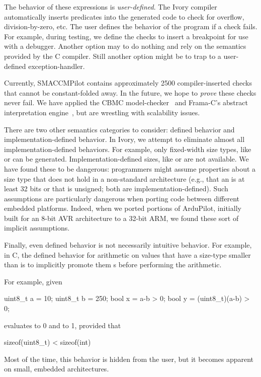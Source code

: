 The behavior of these expressions is \emph{user-defined}.  The Ivory compiler
automatically inserts predicates into the generated code to check for overflow,
division-by-zero, etc.  The user defines the behavior of the program if a check
fails.  For example, during testing, we define the checks to insert a
breakpoint for use with a debugger.  Another option may to do nothing and rely
on the semantics provided by the C compiler.  Still another option might be to
trap to a user-defined exception-handler.

Currently, SMACCMPilot contains approximately 2500 compiler-inserted checks that
cannot be constant-folded away.  In the future, we hope to \emph{prove} these
checks never fail.  We have applied the CBMC model-checker~\cite{} and Frama-C's
abstract interpretation engine~\cite{}, but are wrestling with scalability
issues.

There are two other semantics categories to consider: defined behavior and
implementation-defined behavior.  In Ivory, we attempt to eliminate almost all
implementation-defined behaviors.  For example, only fixed-width size types,
like  or  can be generated.  Implementation-defined
sizes, like  or  are not available.  We have found these to be
dangerous: programmers might assume properties about a size type that does not
hold in a non-standard architecture (e.g., that an  is at least 32 bits
or that  is unsigned; both are implementation-defined).  Such
assumptions are particularly dangerous when porting code between different
embedded platforms.  Indeed, when we ported portions of ArduPilot, initially built
for an 8-bit AVR architecture to a 32-bit ARM, we found these sort of implicit
assumptions.

Finally, even defined behavior is not necessarily intuitive behavior.  For
example, in C, the defined behavior for arithmetic on values that have a
size-type smaller than  is to implicitly promote them s before
performing the arithmetic.

For example, given
\begin{code}
uint8\_t a = 10;
uint8\_t b = 250;
bool    x = a-b > 0;
bool    y = (uint8\_t)(a-b) > 0;
\end{code}
\noindent
{} evaluates to 0 and  to 1, provided that
\begin{code}
sizeof(uint8\_t) < sizeof(int)
\end{code}
\noindent
Most of the time, this behavior is hidden from the user, but it becomes apparent
on small, embedded architectures.

